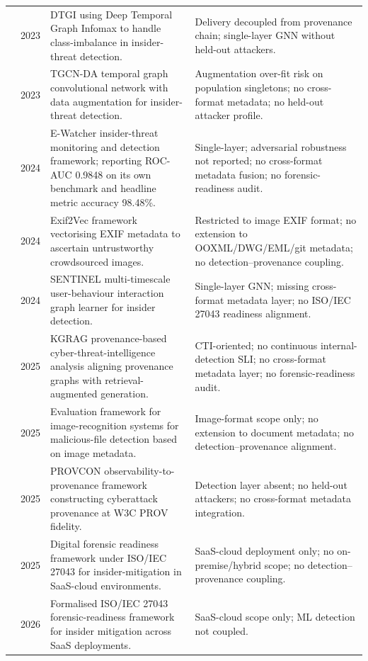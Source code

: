 \begin{table}[t!]
\begin{tabularx}{\textwidth}{l c X X}
\citet{gao2023dtgi} & 2023 & DTGI using Deep Temporal Graph Infomax to handle class-imbalance in insider-threat detection. & Delivery decoupled from provenance chain; single-layer GNN without held-out attackers. \\
\citet{li2023tgcnda} & 2023 & TGCN-DA temporal graph convolutional network with data augmentation for insider-threat detection. & Augmentation over-fit risk on population singletons; no cross-format metadata; no held-out attacker profile. \\
\citet{wei2024ewatcher} & 2024 & E-Watcher insider-threat monitoring and detection framework; reporting ROC-AUC 0.9848 on its own benchmark and headline metric accuracy 98.48\%. & Single-layer; adversarial robustness not reported; no cross-format metadata fusion; no forensic-readiness audit. \\
\citet{umair2024exif2vec} & 2024 & Exif2Vec framework vectorising EXIF metadata to ascertain untrustworthy crowdsourced images. & Restricted to image EXIF format; no extension to OOXML/DWG/EML/git metadata; no detection--provenance coupling. \\
\citet{xiao2024sentinel} & 2024 & SENTINEL multi-timescale user-behaviour interaction graph learner for insider detection. & Single-layer GNN; missing cross-format metadata layer; no ISO/IEC 27043 readiness alignment. \\
\citet{aki2025provenance} & 2025 & KGRAG provenance-based cyber-threat-intelligence analysis aligning provenance graphs with retrieval-augmented generation. & CTI-oriented; no continuous internal-detection SLI; no cross-format metadata layer; no forensic-readiness audit. \\
\citet{yasenenko2025evaluating} & 2025 & Evaluation framework for image-recognition systems for malicious-file detection based on image metadata. & Image-format scope only; no extension to document metadata; no detection--provenance alignment. \\
\citet{yusof2025provcon} & 2025 & PROVCON observability-to-provenance framework constructing cyberattack provenance at W3C PROV fidelity. & Detection layer absent; no held-out attackers; no cross-format metadata integration. \\
\citet{shoderu2025dfrsaas} & 2025 & Digital forensic readiness framework under ISO/IEC 27043 for insider-mitigation in SaaS-cloud environments. & SaaS-cloud deployment only; no on-premise/hybrid scope; no detection--provenance coupling. \\
\citet{shoderu2026dfrconference} & 2026 & Formalised ISO/IEC 27043 forensic-readiness framework for insider mitigation across SaaS deployments. & SaaS-cloud scope only; ML detection not coupled. \\
\bottomrule
\end{tabularx}
\end{table}
